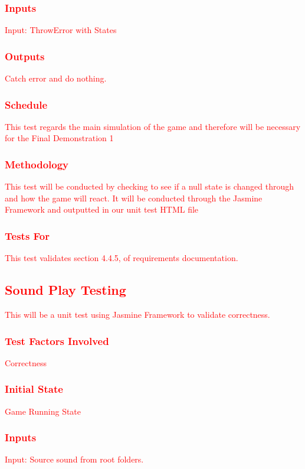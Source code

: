 \documentclass[11pt, oneside]{article}   	%
\begin{document}
\subsubsection{\textcolor{red}{Inputs}}
\textcolor{red}{Input: ThrowError with States}
\subsubsection{\textcolor{red}{Outputs}}
\textcolor{red}{Catch error and do nothing.}
\subsubsection{\textcolor{red}{Schedule}}
\textcolor{red}{This test regards the main simulation of the game and therefore will be necessary for the Final Demonstration 1}
\subsubsection{\textcolor{red}{Methodology}}
\textcolor{red}{This test will be conducted by checking to see if a null state is changed through and how the game will react. It will be conducted through the Jasmine Framework and outputted in our unit test HTML file}
\subsubsection{\textcolor{red}{Tests For}}
\textcolor{red}{This test validates section 4.4.5, of requirements documentation.}

\subsection{\textcolor{red}{Sound Play Testing}}
\textcolor{red}{This will be a unit test using Jasmine Framework to validate correctness.}
\subsubsection{\textcolor{red}{Test Factors Involved}}
\textcolor{red}{Correctness}
\subsubsection{\textcolor{red}{Initial State}}
\textcolor{red}{Game Running State}
\subsubsection{\textcolor{red}{Inputs}}
\textcolor{red}{Input: Source sound from root folders.}
\end{document}

